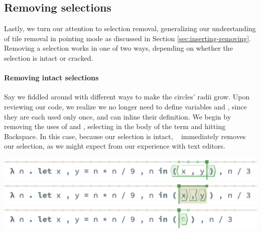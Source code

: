 
\subsection{Removing selections}

Lastly, we turn our attention to selection removal,
generalizing our understanding of tile removal
in pointing mode as discussed in
Section \ref{sec:inserting-removing}.
Removing a selection works in one of two ways,
depending on whether the selection is intact or cracked.

\paragraph{Removing intact selections}
Say we fiddled around with different ways to make
the circles' radii grow.
Upon reviewing our code, we realize we no longer
need to define variables  and ,
since they are each used only once, and can inline
their definition.
We begin by removing the uses of  and ,
selecting  in the body of the 
term and hitting Backspace.
In this case, because our selection is intact, \tylr~
immediately removes our selection, as we might
expect from our experience with text editors.
\begin{center}
  \includegraphics[width=\columnwidth]{img/remove-intact-0.png}
  \includegraphics[width=\columnwidth]{img/remove-intact-1.png}
  \includegraphics[width=\columnwidth]{img/remove-intact-2.png}
\end{center}

